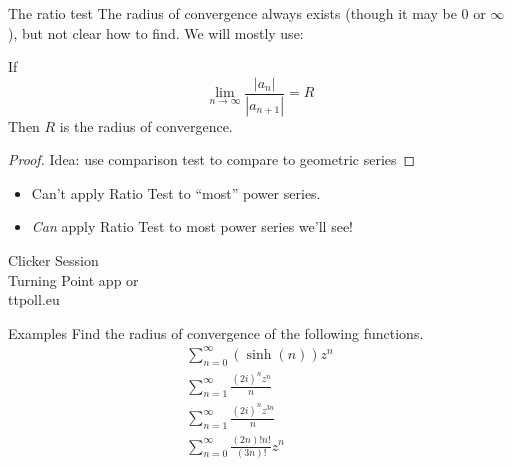 \documentclass{beamer}
\begin{document}
\begin{frame}{The ratio test}
The radius of convergence always exists (though it may be 0 or $\infty$), but not clear how to find.  We will mostly use:
\begin{theorem} If
$$\lim_{n\to\infty} \frac{|a_n|}{|a_{n+1}|}=R$$
Then $R$ is the radius of convergence.
\end{theorem}
\begin{proof} 
Idea: use comparison test to compare to geometric series
\end{proof}
\begin{itemize}
    \item  \alert{Can't} apply Ratio Test to ``most'' power series. \\
\item \emph{Can} apply Ratio Test to most power series we'll see!
\end{itemize}

\end{frame}
\begin{frame}
  
\begin{center}

\Huge

Clicker Session \\
Turning Point app or \\
ttpoll.eu 

\end{center}

\end{frame}
\begin{frame}{Examples}
Find the radius of convergence of the following functions.
\begin{eqnarray}
\sum_{n=0}^\infty (\sinh(n))z^n \\
\sum_{n=1}^\infty \frac{(2i)^nz^n}{n} \\
\sum_{n=1}^\infty \frac{(2i)^nz^{3n}}{n} \\
\sum_{n=0}^\infty \frac{(2n)!n!}{(3n)!} z^n
\end{eqnarray}
    
    


\end{frame}
\end{document}
